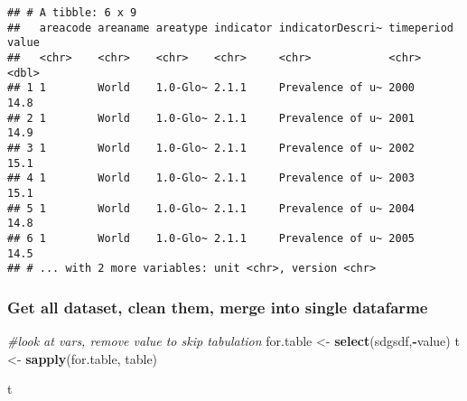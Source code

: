 \documentclass[]{article}
\newenvironment{Shaded}{\begin{snugshade}}{\end{snugshade}}
\newcommand{\KeywordTok}[1]{\textcolor[rgb]{0.13,0.29,0.53}{\textbf{#1}}}
\newcommand{\StringTok}[1]{\textcolor[rgb]{0.31,0.60,0.02}{#1}}
\newcommand{\CommentTok}[1]{\textcolor[rgb]{0.56,0.35,0.01}{\textit{#1}}}
\newcommand{\OperatorTok}[1]{\textcolor[rgb]{0.81,0.36,0.00}{\textbf{#1}}}
\newcommand{\NormalTok}[1]{#1}
\begin{document}
\begin{verbatim}
## # A tibble: 6 x 9
##   areacode areaname areatype indicator indicatorDescri~ timeperiod value
##   <chr>    <chr>    <chr>    <chr>     <chr>            <chr>      <dbl>
## 1 1        World    1.0-Glo~ 2.1.1     Prevalence of u~ 2000        14.8
## 2 1        World    1.0-Glo~ 2.1.1     Prevalence of u~ 2001        14.9
## 3 1        World    1.0-Glo~ 2.1.1     Prevalence of u~ 2002        15.1
## 4 1        World    1.0-Glo~ 2.1.1     Prevalence of u~ 2003        15.1
## 5 1        World    1.0-Glo~ 2.1.1     Prevalence of u~ 2004        14.8
## 6 1        World    1.0-Glo~ 2.1.1     Prevalence of u~ 2005        14.5
## # ... with 2 more variables: unit <chr>, version <chr>
\end{verbatim}

\subsubsection{Get all dataset, clean them, merge into single
datafarme}\label{get-all-dataset-clean-them-merge-into-single-datafarme-1}

\begin{Shaded}
\begin{Highlighting}[]
\CommentTok{#look at vars, remove value to skip tabulation}
\NormalTok{for.table <-}\StringTok{ }\KeywordTok{select}\NormalTok{(sdgsdf,}\OperatorTok{-}\NormalTok{value)}
\NormalTok{t <-}\StringTok{ }\KeywordTok{sapply}\NormalTok{(for.table, table)}

\NormalTok{t}
\end{Highlighting}
\end{Shaded}
\end{document}

